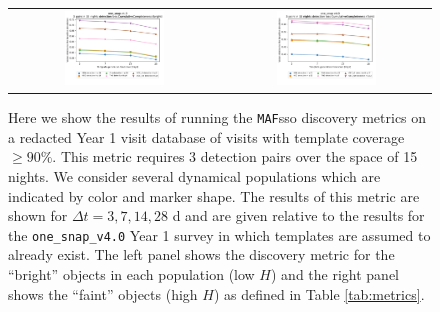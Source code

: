 \documentclass[preprintm,linenumbers]{aastex631}
\newcommand{\baseline}{\texttt{one\_snap\_v4.0}\xspace}
\newcommand{\maf}{\texttt{MAF}\xspace}
\begin{document}
		
		\begin{figure}
			\centering
			\begin{tabular}{c c}
				\includegraphics[width=0.5\textwidth]{results/one_snap_v4_0_n_visits_4_discovery_metric_bright.pdf} &
				\includegraphics[width=0.5\textwidth]{results/one_snap_v4_0_n_visits_4_discovery_metric_faint.pdf} \\
    			
			\end{tabular}
			\caption{Here we show the results of running the \maf \gls*{sso} discovery metrics on a redacted Year 1 visit database of visits with template coverage $\geq 90\%$.
				This metric requires 3 detection pairs over the space of 15 nights.
    We consider several dynamical populations which are indicated by color and marker shape.
				The results of this metric are shown for $\Delta t = 3, 7, 14, 28$ d and are given relative to the results for the \baseline Year 1 survey in which templates are assumed to already exist.
				The left panel shows the discovery metric for the ``bright'' objects in each population (low $H$) and the right panel shows the ``faint'' objects (high $H$) as defined in Table \ref{tab:metrics}.
			}
			\label{fig:temp_gen_discovery_metrics}
		\end{figure}
\end{document}
